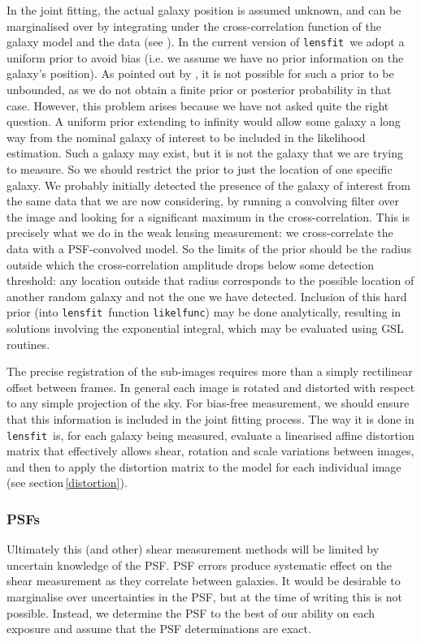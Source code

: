 \documentclass{article}
\def\lensfit{{\tt lensfit}\ }
\begin{document}
In the joint fitting, the actual galaxy position is assumed unknown, and can be marginalised over
by integrating under the cross-correlation function of the galaxy model and the data (see
\citet{miller07a}).  In the current version of \lensfit we adopt a uniform prior to avoid bias
(i.e. we assume we have no prior information on the galaxy's position).  As pointed out by
\citet{miller07a}, it is not possible for such a prior to be unbounded, as we do not obtain a 
finite prior or posterior probability in that case.  However, this problem arises because we have
not asked quite the right question.  A uniform prior extending to infinity would allow some galaxy
a long way from the nominal galaxy of interest to be included in the likelihood estimation.  
Such a galaxy may exist, but it is
not the galaxy that we are trying to measure.  So we should restrict the prior to just the location
of one specific galaxy.  We probably initially detected the presence of the galaxy of interest from
the same data that we are now considering, by running a convolving filter over the image
and looking for a significant maximum in the cross-correlation.  This is precisely what we do in the weak
lensing measurement: we cross-correlate the data with a PSF-convolved model.  So the limits of the
prior should be the radius outside which the cross-correlation amplitude drops below some detection
threshold: any location outside that radius corresponds to the possible location of another random
galaxy and not the one we have detected.  Inclusion of this hard prior (into \lensfit function
{\tt likelfunc}) may be done analytically, resulting in solutions involving the exponential integral,
which may be evaluated using GSL routines.

The precise registration of the sub-images requires more than a simply rectilinear offset between frames.
In general each image is rotated and distorted with respect to any simple projection of the sky.
For bias-free measurement, we should ensure that this information is included in the joint fitting
process.  The way it is done in \lensfit is, for each galaxy being measured, evaluate a linearised
affine distortion matrix that effectively allows shear, rotation and scale variations between images,
and then to apply the distortion matrix to the model for each individual image (see section\,\ref{distortion}).

\subsubsection{PSFs}
Ultimately this (and other) shear measurement methods will be limited by uncertain knowledge of the
PSF.  PSF errors produce systematic effect on the shear measurement as they correlate between galaxies.
It would be desirable to marginalise over uncertainties in the PSF, but at the time of writing
this is not possible.  Instead, we determine the PSF to the best of our ability on each exposure
and assume that the PSF determinations are exact.
\end{document}
